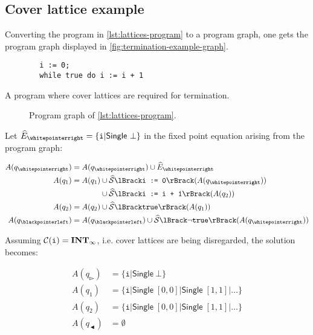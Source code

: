 \subsection{Cover lattice example}\label{subsec:cover-lattice-example}

Converting the program in \autoref{lst:lattices-program} to a program graph, one gets the program graph displayed in \autoref{fig:termination-example-graph}.

\begin{listing}
    \begin{verbatim}
        i := 0;
        while true do i := i + 1
    \end{verbatim}
    \caption{A program where cover lattices are required for termination.}
    \label{lst:lattices-program}
\end{listing}

\begin{figure}
    \centering
    
    \caption{Program graph of \autoref{lst:lattices-program}.}
    \label{fig:termination-example-graph}
\end{figure}

Let $\ab{E}_\whitepointerright = \{ \texttt{i} | \mathsf{Single}\ \bot \}$ in the fixed point equation arising from the program graph:

\begin{align}
    A(q_\whitepointerright) &= A(q_\whitepointerright) \cup \ab{E}_\whitepointerright \\
    A(q_1) &= \begin{aligned}[t]
        A(q_1) &\cup \abssem{\texttt{i := 0}}(A(q_\whitepointerright)) \\
        &\cup \abssem{\texttt{i := i + 1}}(A(q_2))
    \end{aligned} \\
    A(q_2) &= A(q_2) \cup \abssem{\texttt{true}} (A(q_1)) \\
    A(q_\blackpointerleft) &= A(q_\blackpointerleft) \cup \abssem{\neg\texttt{true}}(A(q_\whitepointerright))
\end{align}

Assuming $\mathcal{C}(\texttt{i}) = \mathbf{INT}_{\infty}$, i.e. cover lattices are being disregarded, the solution becomes:

\begin{align}
    A(q_\whitepointerright) &= \{ \texttt{i} |\mathsf{Single}\ \bot \} \\
    A(q_1) &= \{ \texttt{i} | \mathsf{Single} \; [0, 0] | \mathsf{Single} \; [1, 1] | \dots \} \\
    A(q_2) &= \{ \texttt{i} | \mathsf{Single} \; [0, 0] | \mathsf{Single} \; [1, 1] | \dots \} \\
    A(q_\blackpointerleft) &= \emptyset
\end{align}

